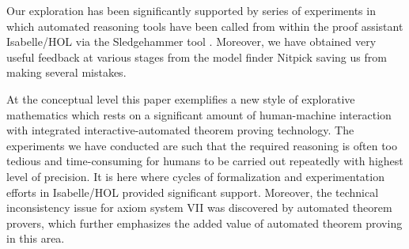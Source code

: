
Our exploration has been significantly supported by series of
experiments in which automated reasoning tools have been called from
within the proof assistant Isabelle/HOL via the
Sledgehammer tool \cite{Sledgehammer}. Moreover, we have obtained
very useful feedback at various stages from the model finder Nitpick
\cite{Nitpick} saving us from making several mistakes.

At the conceptual level this paper exemplifies a new style of
explorative mathematics which rests on a significant amount of
human-machine interaction with integrated interactive-auto\-ma\-ted
theorem proving technology. The experiments we have conducted are such
that the required reasoning is often too tedious and time-consuming
for humans to be carried out repeatedly with highest level of
precision. It is here where cycles of formalization and
experimentation efforts in Isabelle/HOL provided significant
support. Moreover, the technical inconsistency issue for axiom system
VII was discovered by automated theorem provers, which further
emphasizes the added value of automated theorem proving in this area.

